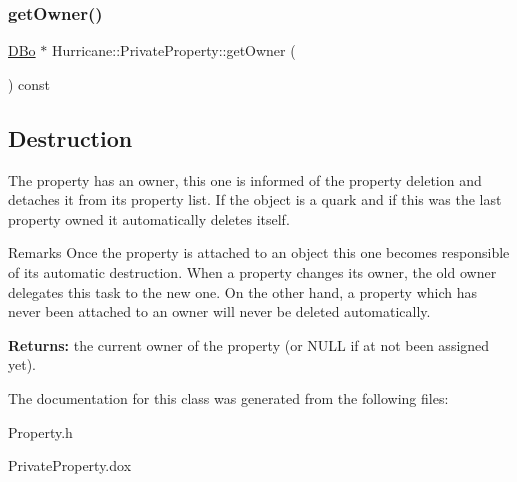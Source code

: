 \subsubsection{\texorpdfstring{get\+Owner()}{getOwner()}}
{\footnotesize\ttfamily \mbox{\hyperlink{classHurricane_1_1DBo}{D\+Bo}} $\ast$ Hurricane\+::\+Private\+Property\+::get\+Owner (\begin{DoxyParamCaption}{ }\end{DoxyParamCaption}) const\hspace{0.3cm}{\ttfamily [inline]}}

\hypertarget{classHurricane_1_1PrivateProperty_secPrivatePropertyDestruction}{}\subsection{Destruction}\label{classHurricane_1_1PrivateProperty_secPrivatePropertyDestruction}
The property has an owner, this one is informed of the property deletion and detaches it from its property list. If the object is a quark and if this was the last property owned it automatically deletes itself.

\begin{DoxyRemark}{Remarks}
Once the property is attached to an object this one becomes responsible of its automatic destruction. When a property changes its owner, the old owner delegates this task to the new one. On the other hand, a property which has never been attached to an owner will never be deleted automatically.
\end{DoxyRemark}
{\bfseries Returns\+:} the current owner of the property (or N\+U\+LL if at not been assigned yet). 

The documentation for this class was generated from the following files\+:\begin{DoxyCompactItemize}
\item 
Property.\+h\item 
Private\+Property.\+dox\end{DoxyCompactItemize}
